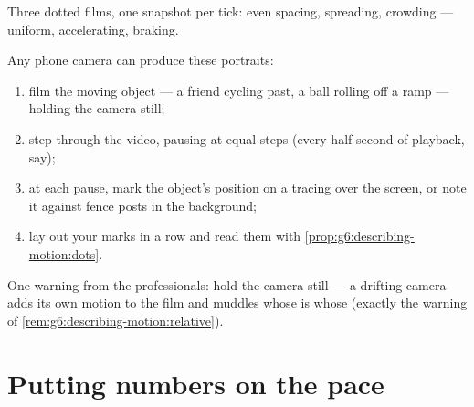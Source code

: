 \begin{omfigure}

{\small Three dotted films, one snapshot per tick: even spacing,
spreading, crowding --- uniform, accelerating, braking.}
\end{omfigure}

\begin{method}\label{met:g6:describing-motion:film}
Any phone camera can produce these portraits:
\begin{enumerate}
  \item film the moving object --- a friend cycling past, a ball
        rolling off a ramp --- holding the camera still;
  \item step through the video, pausing at equal steps (every
        half-second of playback, say);
  \item at each pause, mark the object's position on a tracing
        over the screen, or note it against fence posts in the
        background;
  \item lay out your marks in a row and read them with
        \cref{prop:g6:describing-motion:dots}.
\end{enumerate}
One warning from the professionals: hold the camera still --- a
drifting camera adds its own motion to the film and muddles whose
 is whose (exactly the warning of
\cref{rem:g6:describing-motion:relative}).
\end{method}

\section{Putting numbers on the pace}


